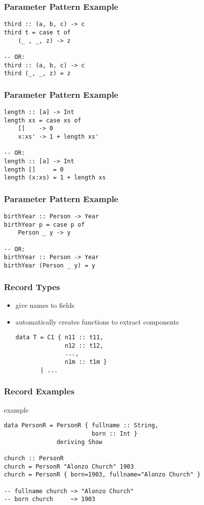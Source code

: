 \documentclass[dvipsnames]{beamer}
\theoremstyle{plain}
\begin{document}
\begin{frame}[fragile]
  \frametitle{Parameter Pattern Example}

  \begin{lstlisting}
third :: (a, b, c) -> c
third t = case t of
    (_ , _, z) -> z

-- OR:
third :: (a, b, c) -> c
third (_, _, z) = z
  \end{lstlisting}
\end{frame}

\begin{frame}[fragile]
  \frametitle{Parameter Pattern Example}

  \begin{lstlisting}[deletekeywords={length}]
length :: [a] -> Int
length xs = case xs of
    []    -> 0
    x:xs' -> 1 + length xs'

-- OR:
length :: [a] -> Int
length []     = 0
length (x:xs) = 1 + length xs
  \end{lstlisting}
\end{frame}

\begin{frame}[fragile]
  \frametitle{Parameter Pattern Example}

  \begin{lstlisting}
birthYear :: Person -> Year
birthYear p = case p of
    Person _ y -> y

-- OR:
birthYear :: Person -> Year
birthYear (Person _ y) = y
  \end{lstlisting}
\end{frame}

\begin{frame}[fragile]
  \frametitle{Record Types}

  \begin{itemize}
    \item give names to fields
    \item automatically creates functions to extract components

    \medskip
    \begin{lstlisting}[style=syntax]
data T = C1 { n11 :: t11,
              n12 :: t12,
              ...,
              n1m :: t1m }
       | ...
    \end{lstlisting}
  \end{itemize}
\end{frame}

\begin{frame}[fragile]
  \frametitle{Record Examples}

  \begin{exampleblock}{example}
    \begin{lstlisting}
data PersonR = PersonR { fullname :: String,
                         born :: Int }
               deriving Show

church :: PersonR
church = PersonR "Alonzo Church" 1903
church = PersonR { born=1903, fullname="Alonzo Church" }

-- fullname church ~> "Alonzo Church"
-- born church     ~> 1903
    \end{lstlisting}
  \end{exampleblock}
\end{frame}
\end{document}
